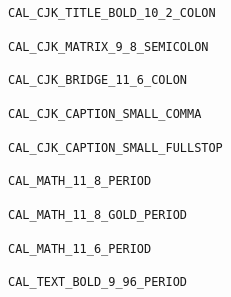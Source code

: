 \documentclass[UTF8,a4paper,11pt,openany]{ctexbook}
\begin{document}
\pagestyle{empty}
\color{SLInk}
\noindent\texttt{CAL\_CJK\_TITLE\_BOLD\_10\_2\_COLON}\par\vspace{5pt}
\noindent\texttt{CAL\_CJK\_MATRIX\_9\_8\_SEMICOLON}\par\vspace{5pt}
\noindent\texttt{CAL\_CJK\_BRIDGE\_11\_6\_COLON}\par\vspace{5pt}
\noindent\texttt{CAL\_CJK\_CAPTION\_SMALL\_COMMA}\hspace{36pt}{\small ，}\par\vspace{5pt}
\noindent\texttt{CAL\_CJK\_CAPTION\_SMALL\_FULLSTOP}\hspace{36pt}{\small 。}\par\vspace{5pt}
\noindent\texttt{CAL\_MATH\_11\_8\_PERIOD}\par\vspace{5pt}
\noindent\texttt{CAL\_MATH\_11\_8\_GOLD\_PERIOD}\par\vspace{5pt}
\noindent\texttt{CAL\_MATH\_11\_6\_PERIOD}\par\vspace{5pt}
\noindent\texttt{CAL\_TEXT\_BOLD\_9\_96\_PERIOD}\hspace{36pt}{\small\bfseries 0.3}\par
\end{document}
